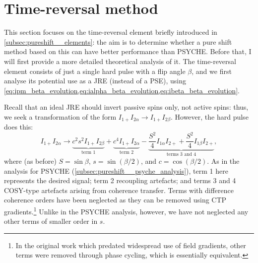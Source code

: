 \section{Time-reversal method}
\label{sec:pureshift__timerev}

This section focuses on the time-reversal element briefly introduced in \cref{subsec:pureshift__elements}: the aim is to determine whether a pure shift method based on this can have better performance than PSYCHE.
Before that, I will first provide a more detailed theoretical analysis of it.
The time-reversal element consists of just a single hard pulse with a flip angle $\beta$, and we first analyse its potential use as a JRE (instead of a PSE), using \cref{eq:ipm_beta_evolution,eq:ialpha_beta_evolution,eq:ibeta_beta_evolution}.

Recall that an ideal JRE should invert passive spins only, not active spins: thus, we seek a transformation of the form $I_{1+}I_{2\alpha} \to I_{1+}I_{2\beta}$.
However, the hard pulse does this:
\begin{equation}
    \label{eq:beta_pulse_not_jre}
    I_{1+}I_{2\alpha} \to
    {\underbrace{c^2s^2 I_{1+}I_{2\beta}}_{\text{term 1}}}
    + {\underbrace{c^4 I_{1+}I_{2\alpha}}_{\text{term 2}}}
    - {\underbrace{\frac{S^2}{4}I_{1\alpha}I_{2+} + \frac{S^2}{4}I_{1\beta}I_{2+}}_{\text{terms 3 and 4}}},
\end{equation}
where (as before) $S = \sin\beta$, $s = \sin(\beta/2)$, and $c = \cos(\beta/2)$.
As in the analysis for PSYCHE (\cref{subsec:pureshift__psyche_analysis}), term 1 here represents the desired signal; term 2 recoupling artefacts; and terms 3 and 4 COSY-type artefacts arising from coherence transfer.
Terms with difference coherence orders have been neglected as they can be removed using CTP gradients.\footnote{In the original work\autocite{Sorensen1985JACS} which predated widespread use of field gradients, other terms were removed through phase cycling, which is essentially equivalent.}
Unlike in the PSYCHE analysis, however, we have not neglected any other terms of smaller order in $s$.

